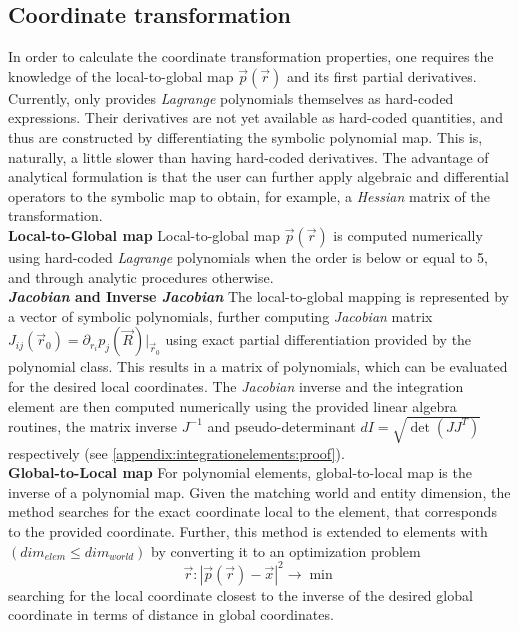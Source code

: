 \subsection{Coordinate transformation}
\label{sec:theory:coordinatetransform}

In order to calculate the coordinate transformation properties, one requires the knowledge of the local-to-global map $\vec{p}(\vec{r})$ and its first partial derivatives. Currently, \curvgeom{} only provides \textit{Lagrange} polynomials themselves as hard-coded expressions. Their derivatives are not yet available as hard-coded quantities, and thus are constructed by differentiating the symbolic polynomial map. This is, naturally, a little slower than having hard-coded derivatives. The advantage of analytical formulation is that the user can further apply algebraic and differential operators to the symbolic map to obtain, for example, a \textit{Hessian} matrix of the transformation.  \\

\noindent
\textbf{Local-to-Global map}
%
Local-to-global map $\vec{p}(\vec{r})$ is computed numerically using hard-coded \textit{Lagrange} polynomials when the order is below or equal to 5, and through analytic procedures otherwise. \\

\noindent
\textbf{\textit{Jacobian} and Inverse \textit{Jacobian}}
%
The local-to-global mapping is represented by a vector of symbolic polynomials, further computing \textit{Jacobian} matrix $J_{ij}(\vec{r}_0) = \partial_{r_i} p_j (\vec{R}) |_{\vec{r}_0}$ using exact partial differentiation provided by the polynomial class. This results in a matrix of polynomials, which can be evaluated for the desired local coordinates. The \textit{Jacobian} inverse and the integration element are then computed numerically using the \dune{} provided linear algebra routines, the matrix inverse $J^{-1}$ and pseudo-determinant $dI = \sqrt{\det(JJ^T)}$ respectively (see \cref{appendix:integrationelements:proof}). \\

\noindent
\textbf{Global-to-Local map}
%
For polynomial elements, global-to-local map is the inverse of a polynomial map. Given the matching world and entity dimension, the method searches for the exact coordinate local to the element, that corresponds to the provided coordinate. Further, this method is extended to elements with $(dim_{elem} \leq dim_{world})$ by converting it to an optimization problem
\begin{equation}
  \label{eq-theory-mapping-optimization}
  \vec{r} : |\vec{p}(\vec{r}) - \vec{x} |^2 \rightarrow \min
\end{equation} 
searching for the local coordinate closest to the inverse of the desired global coordinate in terms of distance in global coordinates. \\

